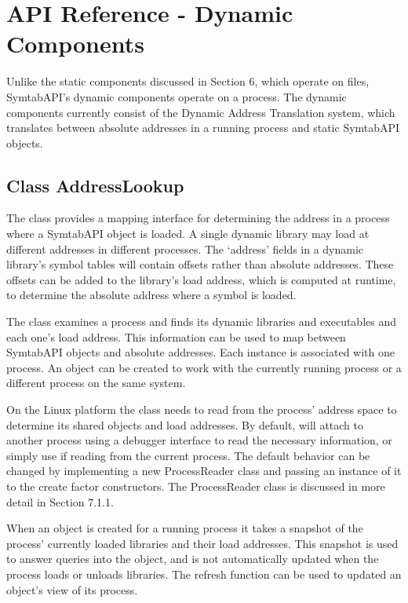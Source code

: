 \section{API Reference - Dynamic Components}

Unlike the static components discussed in Section 6, which operate on files,
SymtabAPI's dynamic components operate on a process. The dynamic components currently consist of the Dynamic Address Translation system, which translates between absolute addresses in a running process and static SymtabAPI objects. 

\subsection{Class AddressLookup}

The  class provides a mapping interface for determining the address in a process where a SymtabAPI object is loaded. A single dynamic library may load at different addresses in different processes. The `address' fields in a dynamic library's symbol tables will contain offsets rather than absolute addresses. These offsets can be added to the library's load address, which is computed at runtime, to determine the absolute address where a symbol is loaded. 

The  class examines a process and finds its dynamic libraries and executables and each one's load address. This information can be used to map between SymtabAPI objects and absolute addresses. Each  instance is associated with one process. An  object can be created to work with the currently running process or a different process on the same system.

On the Linux platform the  class needs to read from the process' address space to determine its shared objects and load addresses. By default,  will attach to another process using a debugger interface to read the necessary information, or simply use  if reading from the current process. The default behavior can be changed by implementing a new ProcessReader class and passing an instance of it to the create factor constructors. The ProcessReader class is discussed in more detail in Section 7.1.1.

When an  object is created for a running process it takes a snapshot of the process' currently loaded libraries and their load addresses. This snapshot is used to answer queries into the  object, and is not automatically updated when the process loads or unloads libraries. The refresh function can be used to updated an  object's view of its process.

